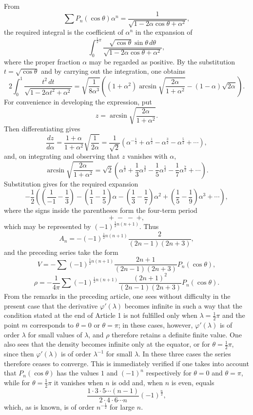 \documentclass[11pt]{article}
\newcommand{\dd}{\,d}
\begin{document}
From
\[
 \sum P_n(\cos\theta)\alpha^n=\frac1{\sqrt{1-2\alpha\cos\theta+\alpha^2}},
\]
the required integral is the coefficient of $\alpha^n$ in the expansion of
\[
 \int_0^{\frac12\pi}\frac{\sqrt{\cos\theta}\sin\theta\dd\theta}{\sqrt{1-2\alpha\cos\theta+\alpha^2}},
\]
where the proper fraction $\alpha$ may be regarded as positive. By the substitution $t=\sqrt{\cos\theta}$ and by carrying out the integration, one obtains
\[
 2\int_0^1\frac{t^2\dd t}{\sqrt{1-2\alpha t^2+\alpha^2}}
 =\sqrt{\frac1{8\alpha^3}}\left((1+\alpha^2)\arcsin\sqrt{\frac{2\alpha}{1+\alpha^2}}-(1-\alpha)\sqrt{2\alpha}\right).
\]
For convenience in developing the expression, put
\[
 z=\arcsin\sqrt{\frac{2\alpha}{1+\alpha^2}}.
\]
Then differentiating gives
\[
 \frac{dz}{d\alpha}=\frac{1+\alpha}{1+\alpha^2}\sqrt{\frac1{2\alpha}}
 =\frac1{\sqrt2}(\alpha^{-\frac12}+\alpha^{\frac12}-\alpha^{\frac32}-\alpha^{\frac52}+\cdots),
\]
and, on integrating and observing that $z$ vanishes with $\alpha$,
\[
 \arcsin\sqrt{\frac{2\alpha}{1+\alpha^2}}
 =\sqrt2\left(\alpha^{\frac12}+\frac13\alpha^{\frac32}-\frac15\alpha^{\frac52}-\frac17\alpha^{\frac72}+\cdots\right).
\]
Substitution gives for the required expansion
\[
 -\frac12\left(\left(\frac1{-1}-\frac13\right)-\left(\frac11-\frac15\right)\alpha-
 \left(\frac13-\frac17\right)\alpha^2+\left(\frac15-\frac19\right)\alpha^3+\cdots\right),
\]
where the signs inside the parentheses form the four-term period
\[
 +\; -\; -\; +,
\]
which may be represented by $(-1)^{\frac12 n(n+1)}$. Thus
\[
 A_n=-(-1)^{\frac12 n(n+1)}\frac{2}{(2n-1)(2n+3)},
\]
and the preceding series take the form
\[
 V=-\sum (-1)^{\frac12 n(n+1)}\frac{2n+1}{(2n-1)(2n+3)}P_n(\cos\theta),
\]
\[
 \rho=-\frac1{4\pi}\sum (-1)^{\frac12 n(n+1)}\frac{(2n+1)^2}{(2n-1)(2n+3)}P_n(\cos\theta).
\]
From the remarks in the preceding article, one sees without difficulty in the present case that the derivative $\varphi'(\lambda)$ becomes infinite in such a way that the condition stated at the end of Article 1 is not fulfilled only when $\lambda=\frac12\pi$ and the point $m$ corresponds to $\theta=0$ or $\theta=\pi$; in these cases, however, $\varphi'(\lambda)$ is of order $\lambda$ for small values of $\lambda$, and $\rho$ therefore retains a definite finite value. One also sees that the density becomes infinite only at the equator, or for $\theta=\frac12\pi$, since then $\varphi'(\lambda)$ is of order $\lambda^{-1}$ for small $\lambda$. In these three cases the series therefore ceases to converge. This is immediately verified if one takes into account that $P_n(\cos\theta)$ has the values $1$ and $(-1)^n$ respectively for $\theta=0$ and $\theta=\pi$, while for $\theta=\frac12\pi$ it vanishes when $n$ is odd and, when $n$ is even, equals
\[
 \frac{1\cdot3\cdot5\cdots(n-1)}{2\cdot4\cdot6\cdots n}(-1)^{\frac n2},
\]
which, as is known, is of order $n^{-\frac12}$ for large $n$.
\end{document}

